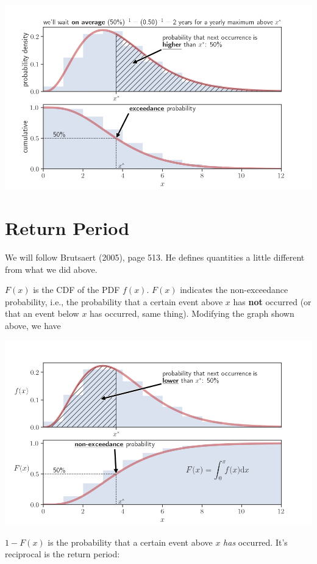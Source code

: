 \documentclass[
  letterpaper,
  DIV=11,
  numbers=noendperiod]{scrreprt}
\begin{document}
\includegraphics{archive/figures/return_prob.gif}

\hypertarget{return-period-1}{%
\section{Return Period}\label{return-period-1}}

We will follow Brutsaert (2005), page 513. He defines quantities a
little different from what we did above.

\(F(x)\) is the CDF of the PDF \(f(x)\). \(F(x)\) indicates the
non-exceedance probability, i.e., the probability that a certain event
above \(x\) has \textbf{not} occurred (or that an event below \(x\) has
occurred, same thing). Modifying the graph shown above, we have

\includegraphics{archive/figures/return_prob_050_reversed.png}

\(1-F(x)\) is the probability that a certain event above \(x\)
\emph{has} occurred. It's reciprocal is the return period:
\end{document}
